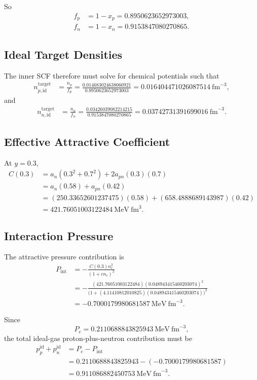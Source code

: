 \documentclass[11pt]{article}
\begin{document}
So
\begin{align}
f_p &= 1-x_p = 0.8950623652973003, \\
f_n &= 1-x_n = 0.9153847080270865.
\end{align}

\subsection{Ideal Target Densities}

The inner SCF therefore must solve for chemical potentials such that
\begin{align}
n_{p,\mathrm{id}}^{\mathrm{target}}
&=
\frac{n_p}{f_p}
=
\frac{0.014683024638060921}{0.8950623652973003}
=
0.016404471026087514\ \mathrm{fm}^{-3},
\end{align}
and
\begin{align}
n_{n,\mathrm{id}}^{\mathrm{target}}
&=
\frac{n_n}{f_n}
=
\frac{0.03426039082214215}{0.9153847080270865}
=
0.03742731391699016\ \mathrm{fm}^{-3}.
\end{align}

\subsection{Effective Attractive Coefficient}

At $y=0.3$,
\begin{align}
C(0.3)
&=
a_n(0.3^2+0.7^2)+2a_{pn}(0.3)(0.7) \\
&=
a_n(0.58)+a_{pn}(0.42) \\
&=
(250.33652601237475)(0.58)
+(658.4888689143987)(0.42) \\
&=
421.76051003122484\ \mathrm{MeV\ fm}^3.
\end{align}

\subsection{Interaction Pressure}

The attractive pressure contribution is
\begin{align}
P_{\mathrm{int}}
&=
-\frac{C(0.3)n_c^2}{(1+cn_c)^2} \\
&=
-\frac{(421.76051003122484)(0.048943415460203074)^2}
{\big(1+(4.11410812010825)(0.048943415460203074)\big)^2} \\
&=
-0.7000179980681587\ \mathrm{MeV\ fm}^{-3}.
\end{align}

Since
\[
P_c=0.2110688843825943\ \mathrm{MeV\ fm}^{-3},
\]
the total ideal-gas proton-plus-neutron contribution must be
\begin{align}
p_p^{\mathrm{id}}+p_n^{\mathrm{id}}
&=
P_c-P_{\mathrm{int}} \\
&=
0.2110688843825943-(-0.7000179980681587) \\
&=
0.911086882450753\ \mathrm{MeV\ fm}^{-3}.
\end{align}
\end{document}
